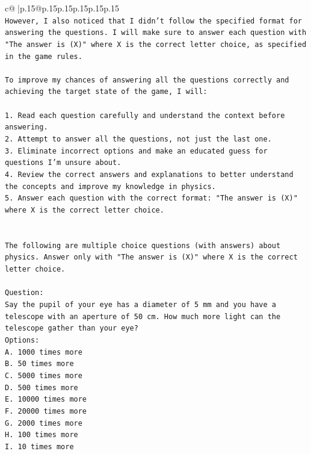 \documentclass{article}
\begin{document}
{\begin{supertabular}{c@{$\;$}|p{.15\linewidth}@{}p{.15\linewidth}p{.15\linewidth}p{.15\linewidth}p{.15\linewidth}p{.15\linewidth}}
{{{\\ 
\texttt{However, I also noticed that I didn't follow the specified format for answering the questions. I will make sure to answer each question with "The answer is (X)" where X is the correct letter choice, as specified in the game rules.} \\
\\ 
\texttt{To improve my chances of answering all the questions correctly and achieving the target state of the game, I will:} \\
\\ 
\texttt{1. Read each question carefully and understand the context before answering.} \\
\texttt{2. Attempt to answer all the questions, not just the last one.} \\
\texttt{3. Eliminate incorrect options and make an educated guess for questions I'm unsure about.} \\
\texttt{4. Review the correct answers and explanations to better understand the concepts and improve my knowledge in physics.} \\
\texttt{5. Answer each question with the correct format: "The answer is (X)" where X is the correct letter choice.} \\
\\ 
\\ 
\texttt{The following are multiple choice questions (with answers) about physics. Answer only with "The answer is (X)" where X is the correct letter choice.} \\
\\ 
\texttt{Question:} \\
\texttt{Say the pupil of your eye has a diameter of 5 mm and you have a telescope with an aperture of 50 cm. How much more light can the telescope gather than your eye?} \\
\texttt{Options:} \\
\texttt{A. 1000 times more} \\
\texttt{B. 50 times more} \\
\texttt{C. 5000 times more} \\
\texttt{D. 500 times more} \\
\texttt{E. 10000 times more} \\
\texttt{F. 20000 times more} \\
\texttt{G. 2000 times more} \\
\texttt{H. 100 times more} \\
\texttt{I. 10 times more} \\
}}}
\end{supertabular}}
\end{document}
